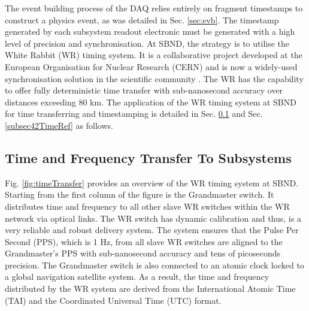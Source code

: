 The event building process of the DAQ relies entirely on fragment timestamps to construct a physics event, as was detailed in Sec. \ref{sec:evb}.
The timestamp generated by each subsystem readout electronic must be generated with a high level of precision and synchronisation.
At SBND, the strategy is to utilise the White Rabbit (WR) timing system.
It is a collaborative project developed at the European Organisation for Nuclear Research (CERN) and is now a widely-used synchronisation solution in the scientific community \cite{WR_paper}.
The WR has the capability to offer fully deterministic time transfer with sub-nanosecond accuracy over distances exceeding 80 km.
The application of the WR timing system at SBND for time transferring and timestamping is detailed in Sec. \ref{subsec41TimeRef} and Sec. \ref{subsec42TimeRef} as follows.



\subsection{Time and Frequency Transfer To Subsystems}
\label{subsec41TimeRef}

Fig. \ref{fig:timeTransfer} provides an overview of the WR timing system at SBND.
Starting from the first column of the figure is the Grandmaster switch.
It distributes time and frequency to all other slave WR switches within the WR network via optical links.
The WR switch has dynamic calibration and thus, is a very reliable and robust delivery system.
The system ensures that the Pulse Per Second (PPS), which is 1 Hz, from all slave WR switches are aligned to the Grandmaster's PPS with sub-nanosecond accuracy and tens of picoseconds precision.
The Grandmaster switch is also connected to an atomic clock locked to a global navigation satellite system.
As a result, the time and frequency distributed by the WR system are derived from the International Atomic Time (TAI) and the Coordinated Universal Time (UTC) format.

